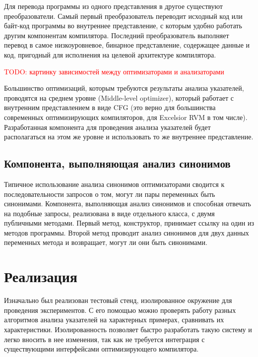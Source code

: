 \documentclass[14pt,titlepage]{extarticle}
\newcommand{\todo}[1]{\textcolor{red}{TODO: #1}}
\newcommand{\eng}[1]{{\English#1}}
\begin{document}
      Для перевода программы из одного представления в другое существуют
      преобразователи.
      Самый первый преобразователь переводит исходный код или байт-код
      программы во внутреннее представление, с которым удобно работать другим
      компонентам компилятора.
      Последний преобразователь выполняет перевод в самое низкоуровневое,
      бинарное представление, содержащее данные и код, пригодный для исполнения
      на целевой архитектуре компилятора.

      \todo{картинку зависимостей между оптимизаторами и анализаторами}

      Большинство оптимизаций, которым требуются результаты анализа указателей,
      проводятся на среднем уровне (\eng{Middle-level optimizer}), который
      работает с внутренним представлением в виде CFG (это верно для
      большинства современных оптимизирующих компиляторов, для Excelsior RVM в
      том числе). Разработанная компонента для проведения анализа указателей
      будет располагаться на этом же уровне и использовать то же внутреннее
      представление.

    \subsection{Компонента, выполняющая анализ синонимов}
      \label{section:analysis_component}

      Типичное использование анализа синонимов оптимизаторами сводится к
      последовательности запросов о том, могут ли пары переменных быть
      синонимами.
      Компонента, выполняющая анализ синонимов и способная отвечать на подобные
      запросы, реализована в виде отдельного класса, с двумя публичными
      методами.
      Первый метод, конструктор, принимает ссылку на один из методов программы.
      Второй метод проводит анализ синонимов для двух данных переменных метода
      и возвращает, могут ли они быть синонимами.

  \newpage
  \section{Реализация}

    Изначально был реализован тестовый стенд, изолированное окружение для
    проведения экспериментов. С его помощью можно проверять работу
    разных алгоритмов анализа указателей на характерных примерах, сравнивать их
    характеристики. Изолированность позволяет быстро разработать такую систему
    и легко вносить в нее изменения, так как не требуется интеграция с
    существующими интерфейсами оптимизирующего компилятора.
\end{document}
